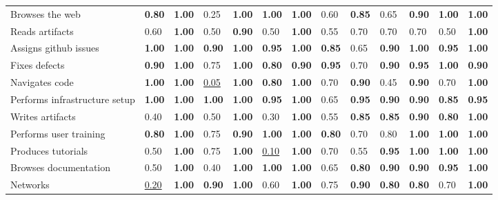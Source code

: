 \begin{tabular}{lllllllllllll}
Browses the web & \textbf{0.80} & \textbf{1.00} & 0.25 & \textbf{1.00} & \textbf{1.00} & \textbf{1.00} & 0.60 & \textbf{0.85} & 0.65 & \textbf{0.90} & \textbf{1.00} & \textbf{1.00} \\
Reads artifacts & 0.60 & \textbf{1.00} & 0.50 & \textbf{0.90} & 0.50 & \textbf{1.00} & 0.55 & 0.70 & 0.70 & 0.70 & 0.50 & \textbf{1.00} \\
Assigns github issues & \textbf{1.00} & \textbf{1.00} & \textbf{0.90} & \textbf{1.00} & \textbf{0.95} & \textbf{1.00} & \textbf{0.85} & 0.65 & \textbf{0.90} & \textbf{1.00} & \textbf{0.95} & \textbf{1.00} \\
Fixes defects & \textbf{0.90} & \textbf{1.00} & 0.75 & \textbf{1.00} & \textbf{0.80} & \textbf{0.90} & \textbf{0.95} & 0.70 & \textbf{0.90} & \textbf{0.95} & \textbf{1.00} & \textbf{0.90} \\
Navigates code & \textbf{1.00} & \textbf{1.00} & \underline{0.05} & \textbf{1.00} & \textbf{0.80} & \textbf{1.00} & 0.70 & \textbf{0.90} & 0.45 & \textbf{0.90} & 0.70 & \textbf{1.00} \\
Performs infrastructure setup & \textbf{1.00} & \textbf{1.00} & \textbf{1.00} & \textbf{1.00} & \textbf{0.95} & \textbf{1.00} & 0.65 & \textbf{0.95} & \textbf{0.90} & \textbf{0.90} & \textbf{0.85} & \textbf{0.95} \\
Writes artifacts & 0.40 & \textbf{1.00} & 0.50 & \textbf{1.00} & 0.30 & \textbf{1.00} & 0.55 & \textbf{0.85} & \textbf{0.85} & \textbf{0.90} & \textbf{0.80} & \textbf{1.00} \\
Performs user training & \textbf{0.80} & \textbf{1.00} & 0.75 & \textbf{0.90} & \textbf{1.00} & \textbf{1.00} & \textbf{0.80} & 0.70 & 0.80 & \textbf{1.00} & \textbf{1.00} & \textbf{1.00} \\
Produces tutorials & 0.50 & \textbf{1.00} & 0.75 & \textbf{1.00} & \underline{0.10} & \textbf{1.00} & 0.70 & 0.55 & \textbf{0.95} & \textbf{1.00} & \textbf{1.00} & \textbf{1.00} \\
Browses documentation & 0.50 & \textbf{1.00} & 0.40 & \textbf{1.00} & \textbf{1.00} & \textbf{1.00} & 0.65 & \textbf{0.80} & \textbf{0.90} & \textbf{0.90} & \textbf{0.95} & \textbf{1.00} \\
Networks & \underline{0.20} & \textbf{1.00} & \textbf{0.90} & \textbf{1.00} & 0.60 & \textbf{1.00} & 0.75 & \textbf{0.90} & \textbf{0.80} & \textbf{0.80} & 0.70 & \textbf{1.00} \\
\bottomrule
\end{tabular}
